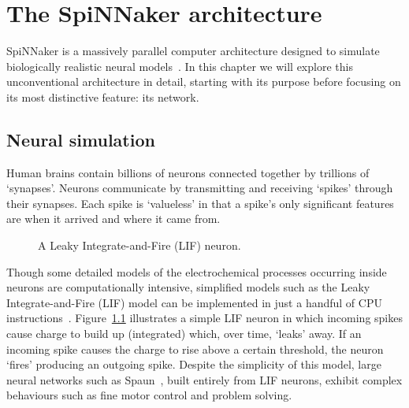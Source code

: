 \chapter{The SpiNNaker architecture}

	\label{sec:background}
	
	SpiNNaker is a massively parallel computer architecture designed to simulate
	biologically realistic neural models~\cite{furber07}. In this chapter we will
	explore this unconventional architecture in detail, starting with its purpose
	before focusing on its most distinctive feature: its network.
	
	
	\section{Neural simulation}
		
		Human brains contain billions of neurons connected together by trillions of
		`synapses'. Neurons communicate by transmitting and receiving `spikes'
		through their synapses. Each spike is `valueless' in that a spike's only
		significant features are when it arrived and where it came from.
		
		\begin{figure}
			\center
			
			\caption{A Leaky Integrate-and-Fire (LIF) neuron.}
			\label{fig:lif-neuron}
		\end{figure}
		
		Though some detailed models of the electrochemical processes occurring
		inside neurons are computationally intensive, simplified models such as the
		Leaky Integrate-and-Fire (LIF) model can be implemented in just a handful
		of CPU instructions~\cite{vainbrand11}. Figure~\ref{fig:lif-neuron}
		illustrates a simple LIF neuron in which incoming spikes cause charge to
		build up (integrated) which, over time, `leaks' away. If an incoming spike
		causes the charge to rise above a certain threshold, the neuron `fires'
		producing an outgoing spike. Despite the simplicity of this model, large
		neural networks such as Spaun~\cite{eliasmith12}, built entirely from LIF
		neurons, exhibit complex behaviours such as fine motor control and problem
		solving.
		
